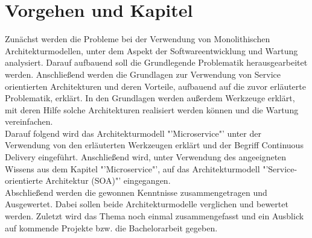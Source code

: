 \section{Vorgehen und Kapitel}
\label{sec:vorgehen}
Zunächst werden die Probleme bei der Verwendung von Monolithischen Architekturmodellen, unter dem Aspekt der Softwareentwicklung und Wartung analysiert. Darauf aufbauend soll die Grundlegende Problematik herausgearbeitet werden. Anschließend werden die Grundlagen zur Verwendung von Service orientierten Architekturen und deren Vorteile, aufbauend auf die zuvor erläuterte Problematik, erklärt. In den Grundlagen werden außerdem Werkzeuge erklärt, mit deren Hilfe solche Architekturen realisiert werden können und die Wartung vereinfachen.
\\
Darauf folgend wird das Architekturmodell "'Microservice"' unter der Verwendung von den erläuterten Werkzeugen erklärt und der Begriff Continuous Delivery eingeführt. Anschließend wird, unter Verwendung des angeeigneten Wissens aus dem Kapitel "'Microservice"', auf das Architekturmodell "'Service-orientierte Architektur (SOA)"' eingegangen.
\\
Abschließend werden die gewonnen Kenntnisse zusammengetragen und Ausgewertet. Dabei sollen beide Architekturmodelle verglichen und bewertet werden. Zuletzt wird das Thema noch einmal zusammengefasst und ein Ausblick auf kommende Projekte bzw. die Bachelorarbeit gegeben.